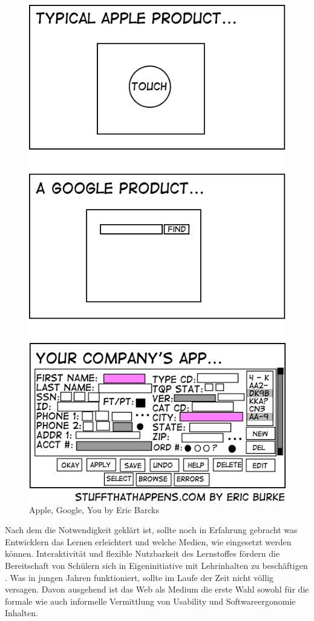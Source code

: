 \documentclass[a4paper, 12pt, twoside, BCOR=20mm, DIV=calc, abstracton, parskip=half*, toc=bibliography, toc=listof, headsepline, footsepline, headings=small, numbers=enddot]{scrreprt}
\begin{document}
	\begin{figure}[h]
		\centering
		\includegraphics[scale=0.7]{Bild/Usability_Comic.jpg}
		\caption{Apple, Google, You by Eric Barcks}
	\end{figure}
	Nach dem die Notwendigkeit geklärt ist, sollte noch in Erfahrung gebracht was Entwicklern das Lernen erleichtert und welche Medien, wie eingesetzt werden können. 
	Interaktivität und flexible Nutzbarkeit des Lernstoffes fördern die Bereitschaft von Schülern sich in  Eigeninitiative mit Lehrinhalten zu beschäftigen \cite[S.32 ff.]{beck2000eigenstandiges}. Was in jungen Jahren funktioniert, sollte im Laufe der Zeit nicht völlig versagen. Davon ausgehend ist das Web als Medium die erste Wahl sowohl für die formale wie auch informelle Vermittlung von Usability und Softwareergonomie Inhalten. 
	
\end{document}
